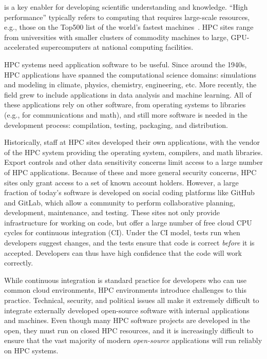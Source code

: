 \documentclass{IEEEcsmag}
\begin{document}
 is a key enabler for developing scientific understanding and knowledge.
``High performance'' typically refers to computing that requires large-scale
resources, e.g., those on the Top500 list of the world's fastest machines~\cite{top500}.
HPC sites range from universities with smaller clusters of commodity machines to large,
GPU-accelerated supercomputers at national computing facilities.

HPC systems need application software to be useful. Since around the 1940s, HPC
applications have spanned the computational science domains: simulations and modeling in
climate, physics, chemistry, engineering, etc. More recently, the field grew
to include applications in data analysis and machine learning.
All of these applications rely on other software, from operating systems to libraries
(e.g., for communications and math), and still more software is needed in the development
process: compilation, testing, packaging, and distribution.

Historically, staff at HPC sites developed their own applications, with the vendor of the
HPC system providing the operating system, compilers, and math libraries. Export controls and
other data sensitivity concerns limit access to a large number of HPC applications.
Because of these and more general security concerns, HPC sites only grant access to a set
of known account holders. However, a large fraction of
today's software is developed on social coding platforms like GitHub and GitLab, which
allow a community to perform collaborative planning, development, maintenance, and
testing. These sites not only provide infrastructure for working on code, but offer a large
number of free cloud CPU cycles for continuous integration (CI). Under the CI model,
tests run when developers suggest changes, and the tests ensure that code is
correct {\it before} it is accepted. Developers can thus have high confidence that
the code will work correctly.

While continuous integration is standard practice for developers who can use common
cloud environments, HPC environments introduce challenges to this practice. Technical,
security, and political issues all make it extremely difficult to integrate externally
developed open-source software with internal applications and machines. Even though many
HPC software projects are developed in the open, they must run on closed HPC resources, and it is
increasingly difficult to ensure that the vast majority of modern {\it open-source}
applications will run reliably on HPC systems.
\end{document}
